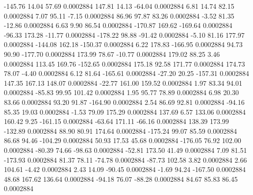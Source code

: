      -145.76       14.04       57.69     0.0002884
      147.81       14.13      -64.04     0.0002884
        6.81       14.74       82.15     0.0002884
        7.07       95.11       -7.15     0.0002884
       86.96       97.87       83.26     0.0002884
       -3.52       81.35      -12.86     0.0002884
        6.63        9.90       86.54     0.0002884
     -170.87      169.62     -169.64     0.0002884
      -96.33      173.28      -11.77     0.0002884
     -178.22       98.88      -91.42     0.0002884
       -5.10       81.16      177.97     0.0002884
     -144.08      162.18     -150.37     0.0002884
        6.22      178.83     -166.95     0.0002884
       94.73       90.90     -177.70     0.0002884
      173.99       78.67      -10.77     0.0002884
      179.02       88.25        3.46     0.0002884
      113.45      169.76     -152.65     0.0002884
      175.18       92.58      171.77     0.0002884
      174.73       78.07       -4.40     0.0002884
        6.12       81.64     -165.61     0.0002884
      -27.20       20.25     -157.31     0.0002884
      147.35      167.13      148.07     0.0002884
      -22.77      161.00      159.52     0.0002884
        1.97       83.34       94.01     0.0002884
      -85.83       99.95      101.42     0.0002884
        1.95       95.77       78.89     0.0002884
        6.98       20.30       83.66     0.0002884
       93.20       91.87     -164.90     0.0002884
        2.54       86.69       92.81     0.0002884
      -94.16       85.35       19.03     0.0002884
       -1.53       79.09      175.29     0.0002884
      137.69        6.57      133.06     0.0002884
      160.42        9.25     -161.15     0.0002884
      -63.64      171.11      -66.16     0.0002884
      138.39      173.99     -132.89     0.0002884
       88.90       80.91      174.64     0.0002884
     -175.24       99.07       85.59     0.0002884
       86.68       94.46     -104.29     0.0002884
       50.93       17.53       45.68     0.0002884
     -176.05       76.92      102.00     0.0002884
      -80.39       74.66      -98.63     0.0002884
      -52.81      173.50       41.49     0.0002884
        7.09       81.51     -173.93     0.0002884
       81.37       78.11      -74.78     0.0002884
      -87.73      102.58        3.82     0.0002884
        2.66      104.61       -4.42     0.0002884
        2.43       14.09      -90.45     0.0002884
       -1.69       94.24     -167.50     0.0002884
       48.68      167.62      136.64     0.0002884
      -94.18       76.07      -88.28     0.0002884
       84.67       85.83       86.45     0.0002884
